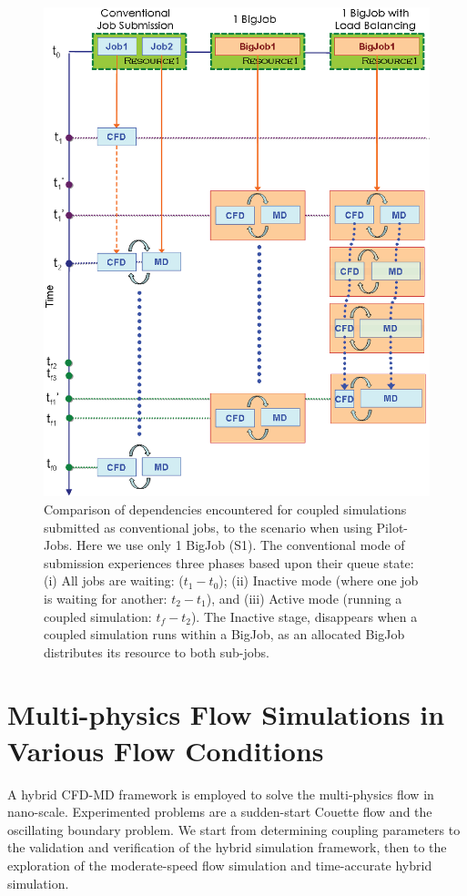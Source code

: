 \documentclass[preprint,12pt]{elsarticle}
\begin{document}
\begin{figure}
\centering
\includegraphics[width=0.8\linewidth]{Simulation_Time_of_One_BigJob.eps}
\caption{\small Comparison of dependencies encountered for coupled
  simulations submitted as conventional jobs, to the scenario when
  using Pilot-Jobs. Here we use only 1 BigJob (S1). The conventional
  mode of submission experiences three phases based upon their queue
  state: (i) All jobs are waiting: ($t_1-t_0$); (ii) Inactive mode
  (where one job is waiting for another: $t_2-t_1$), and (iii) Active
  mode (running a coupled simulation: $t_f-t_2$). The Inactive stage,
  disappears when a coupled simulation runs within a BigJob, as an
  allocated BigJob distributes its resource to both sub-jobs.}
\label{Fig:OneBJ_Flow}
\vspace{-1em}
\end{figure}



\section{Multi-physics Flow Simulations in Various Flow Conditions}
\label{sec:accuracy}
A hybrid CFD-MD framework is employed to solve the multi-physics flow in nano-scale. Experimented problems are a sudden-start Couette flow and the oscillating boundary problem. We start from determining coupling parameters to the validation and verification of the hybrid simulation framework, then to the exploration of the moderate-speed flow simulation and time-accurate hybrid simulation.
\end{document}
